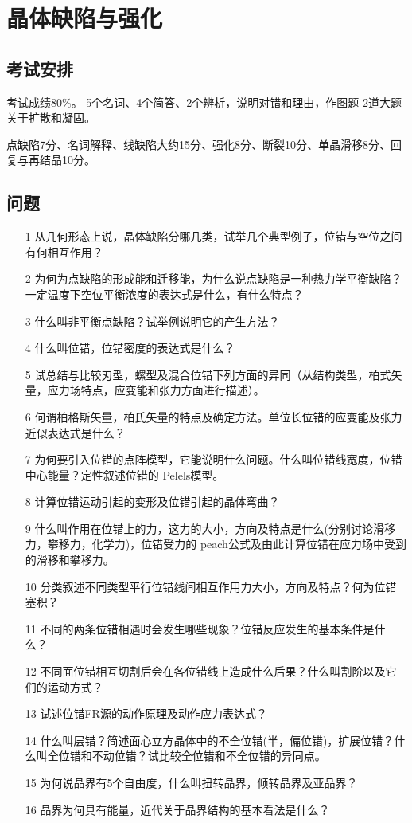 \chapter{晶体缺陷与强化}
    \section{考试安排}
        考试成绩80\%。
        5个名词、4个简答、2个辨析，说明对错和理由，作图题
        2道大题关于扩散和凝固。

        点缺陷7分、名词解释、线缺陷大约15分、强化8分、断裂10分、单晶滑移8分、回复与再结晶10分。
    \section{问题}
    \begin{itemize}
        \item[1] 从几何形态上说，晶体缺陷分哪几类，试举几个典型例子，位错与空位之间有何相互作用？
        \item[2] 为何为点缺陷的形成能和迁移能，为什么说点缺陷是一种热力学平衡缺陷？一定温度下空位平衡浓度的表达式是什么，有什么特点？
        \item[3] 什么叫非平衡点缺陷？试举例说明它的产生方法？
        \item[4] 什么叫位错，位错密度的表达式是什么？
        \item[5] 试总结与比较刃型，螺型及混合位错下列方面的异同（从结构类型，柏式矢量，应力场特点，应变能和张力方面进行描述）。
        \item[6] 何谓柏格斯矢量，柏氏矢量的特点及确定方法。单位长位错的应变能及张力近似表达式是什么？
        \item[7] 为何要引入位错的点阵模型，它能说明什么问题。什么叫位错线宽度，位错中心能量？定性叙述位错的 Pelels模型。
        \item[8] 计算位错运动引起的变形及位错引起的晶体弯曲？
        \item[9] 什么叫作用在位错上的力，这力的大小，方向及特点是什么(分别讨论滑移力，攀移力，化学力)，位错受力的 peach公式及由此计算位错在应力场中受到的滑移和攀移力。 
        \item[10] 分类叙述不同类型平行位错线间相互作用力大小，方向及特点？何为位错塞积？
        \item[11] 不同的两条位错相遇时会发生哪些现象？位错反应发生的基本条件是什么？
        \item[12] 不同面位错相互切割后会在各位错线上造成什么后果？什么叫割阶以及它们的运动方式？
        \item[13] 试述位错FR源的动作原理及动作应力表达式？
        \item[14] 什么叫层错？简述面心立方晶体中的不全位错(半，偏位错)，扩展位错？什么叫全位错和不动位错？试比较全位错和不全位错的异同点。
        \item[15] 为何说晶界有5个自由度，什么叫扭转晶界，倾转晶界及亚品界？
        \item[16] 晶界为何具有能量，近代关于晶界结构的基本看法是什么？
    \end{itemize}